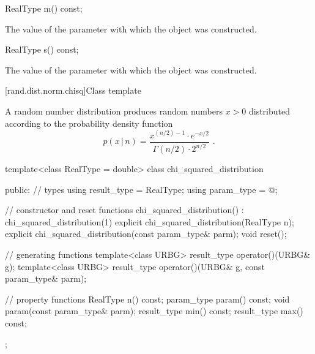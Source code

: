 %
\begin{itemdecl}
RealType m() const;
\end{itemdecl}

\begin{itemdescr}
\pnum\returns The value of the  parameter
 with which the object was constructed.
\end{itemdescr}

%
\begin{itemdecl}
RealType s() const;
\end{itemdecl}

\begin{itemdescr}
\pnum\returns The value of the  parameter
 with which the object was constructed.
\end{itemdescr}


[rand.dist.norm.chisq]{Class template }%
%
%

\pnum
A  random number distribution
produces random numbers $x > 0$
distributed according to
the probability density function%
%
%
\[ p(x\,|\,n) = \frac{x^{(n/2)-1} \cdot e^{-x/2}}{\Gamma(n/2) \cdot 2^{n/2}} \text{ .} \]

%
\begin{codeblock}
template<class RealType = double>
  class chi_squared_distribution {
  public:
    // types
    using result_type = RealType;
    using param_type  = @\unspec@;

    // constructor and reset functions
    chi_squared_distribution() : chi_squared_distribution(1) {}
    explicit chi_squared_distribution(RealType n);
    explicit chi_squared_distribution(const param_type& parm);
    void reset();

    // generating functions
    template<class URBG>
      result_type operator()(URBG& g);
    template<class URBG>
      result_type operator()(URBG& g, const param_type& parm);

    // property functions
    RealType n() const;
    param_type param() const;
    void param(const param_type& parm);
    result_type min() const;
    result_type max() const;
  };
\end{codeblock}


